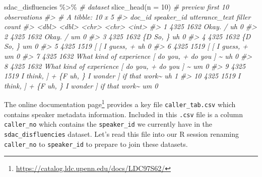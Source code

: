 \documentclass[
]{article}
\newenvironment{Shaded}{\begin{snugshade}}{\end{snugshade}}
\newcommand{\AttributeTok}[1]{\textcolor[rgb]{0.77,0.63,0.00}{#1}}
\newcommand{\CommentTok}[1]{\textcolor[rgb]{0.56,0.35,0.01}{\textit{#1}}}
\newcommand{\DecValTok}[1]{\textcolor[rgb]{0.00,0.00,0.81}{#1}}
\newcommand{\FunctionTok}[1]{\textcolor[rgb]{0.00,0.00,0.00}{#1}}
\newcommand{\NormalTok}[1]{#1}
\newcommand{\SpecialCharTok}[1]{\textcolor[rgb]{0.00,0.00,0.00}{#1}}
\DeclareRobustCommand{\href}[2]{#2\footnote{\url{#1}}}
\begin{document}
\begin{Shaded}
\begin{Highlighting}[]
\NormalTok{sdac\_disfluencies }\SpecialCharTok{\%\textgreater{}\%} \CommentTok{\# dataset}
  \FunctionTok{slice\_head}\NormalTok{(}\AttributeTok{n =} \DecValTok{10}\NormalTok{) }\CommentTok{\# preview first 10 observations}
\CommentTok{\#\textgreater{} \# A tibble: 10 x 5}
\CommentTok{\#\textgreater{}    doc\_id speaker\_id utterance\_text                                 filler count}
\CommentTok{\#\textgreater{}     \textless{}dbl\textgreater{}      \textless{}dbl\textgreater{} \textless{}chr\textgreater{}                                          \textless{}chr\textgreater{}  \textless{}int\textgreater{}}
\CommentTok{\#\textgreater{}  1   4325       1632 Okay.  /                                       uh         0}
\CommentTok{\#\textgreater{}  2   4325       1632 Okay.  /                                       um         0}
\CommentTok{\#\textgreater{}  3   4325       1632 \{D So, \}                                       uh         0}
\CommentTok{\#\textgreater{}  4   4325       1632 \{D So, \}                                       um         0}
\CommentTok{\#\textgreater{}  5   4325       1519 [ [ I guess, +                                 uh         0}
\CommentTok{\#\textgreater{}  6   4325       1519 [ [ I guess, +                                 um         0}
\CommentTok{\#\textgreater{}  7   4325       1632 What kind of experience [ do you, + do you ] \textasciitilde{} uh         0}
\CommentTok{\#\textgreater{}  8   4325       1632 What kind of experience [ do you, + do you ] \textasciitilde{} um         0}
\CommentTok{\#\textgreater{}  9   4325       1519 I think, ] + \{F uh, \} I wonder ] if that work\textasciitilde{} uh         1}
\CommentTok{\#\textgreater{} 10   4325       1519 I think, ] + \{F uh, \} I wonder ] if that work\textasciitilde{} um         0}
\end{Highlighting}
\end{Shaded}

The \href{https://catalog.ldc.upenn.edu/docs/LDC97S62/}{online documentation page} provides a key file \texttt{caller\_tab.csv} which contains speaker metadata information. Included in this \texttt{.csv} file is a column \texttt{caller\_no} which contains the \texttt{speaker\_id} we currently have in the \texttt{sdac\_disfluencies} dataset. Let's read this file into our R session renaming \texttt{caller\_no} to \texttt{speaker\_id} to prepare to join these datasets.
\end{document}
